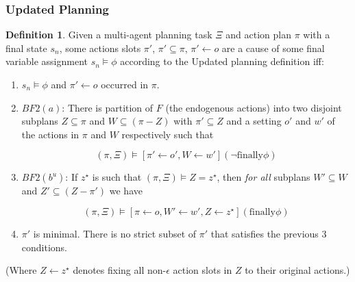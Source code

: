 \documentclass{article}
\theoremstyle{plain}
\theoremstyle{definition}
\newtheorem{defn}[thm]{Definition} %
\begin{document}
\subsubsection*{Updated Planning}\label{sec:updatedPlanning}
\begin{defn}
Given a multi-agent planning task $\Xi$ and action plan $\pi$ with a final state $s_n$, some actions slots $\pi'$, $\pi' \subseteq \pi$, $\pi' \leftarrow o$ are a cause of some final variable assignment $s_n \models \phi$ according to the Updated planning definition iff:
\begin{enumerate}
\item $s_n \models \phi$ and $\pi'\leftarrow o$ occurred in $\pi$.


\item $BF2(a)$: There is partition of $F$ (the endogenous actions) into two disjoint subplans $Z \subseteq \pi$ and $W \subseteq (\pi - Z)$ with $\pi' \subseteq Z$ and a setting $o'$ and $w'$ of the actions in $\pi$ and $W$ respectively such that

\[
(\pi, \Xi) \models [\pi' \leftarrow o', W \leftarrow w'](\lnot \textrm{finally} \phi)
\]

\item $BF2(b^u)$: If $z^\star$ is such that $(\pi, \Xi) \models Z = z^\star$, then \textit{for all} subplans $W' \subseteq W$ and $Z' \subseteq (Z - \pi')$ we have

\[
(\pi, \Xi) \models [\pi \leftarrow o, W' \leftarrow w', Z \leftarrow z^\star](\textrm{finally} \phi)
\]

\item $\pi'$ is minimal. There is no strict subset of $\pi'$ that satisfies the previous 3 conditions.
\end{enumerate}
\end{defn}

(Where $Z\leftarrow z^\star$ denotes fixing all non-$\epsilon$ action slots in $Z$ to their original actions.)
\end{document}
